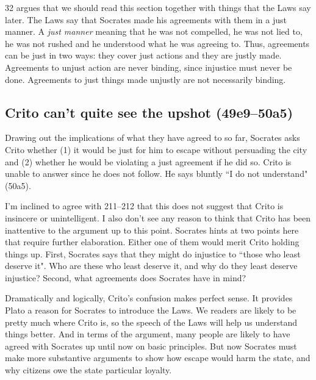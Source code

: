 \documentclass[12pt,letterpaper]{article}
\begin{document}
\cite{kraut1984} 32 argues that we should read this section together with things that the Laws say later. The Laws say that Socrates made his agreements with them in a just manner. A \emph{just manner} meaning that he was not compelled, he was not lied to, he was not rushed and he understood what he was agreeing to. Thus, agreements can be just in two ways: they cover just actions and they are justly made. Agreements to unjust action are never binding, since injustice must never be done. Agreements to just things made unjustly are not necessarily binding.

\subsection*{Crito can't quite see the upshot (49e9--50a5)}

Drawing out the implications of what they have agreed to so far, Socrates
asks Crito whether (1) it would be just for him to escape without
persuading the city and (2) whether he would be violating a just agreement
if he did so. Crito is unable to answer since he does not follow. He says
bluntly ``I do not understand" (50a5).

I'm inclined to agree with \cite{brickhouse-smith2004-plato-trial-of-socrates} 211--212 that this does
not suggest that Crito is insincere or unintelligent. I also don't see any
reason to think that Crito has been inattentive to the argument up to this
point. Socrates hints at two points here that require further elaboration.
Either one of them would merit Crito holding things up. First, Socrates
says that they might do injustice to ``those who least deserve it". Who are
these who least deserve it, and why do they least deserve injustice?
Second, what agreements does Socrates have in mind?

Dramatically and logically, Crito's confusion makes perfect sense. It
provides Plato a reason for Socrates to introduce the Laws. We readers are
likely to be pretty much where Crito is, so the speech of the Laws will
help us understand things better. And in terms of the argument, many
people are likely to have agreed with Socrates up until now on basic
principles. But now Socrates must make more substantive arguments to show
how escape would harm the state, and why citizens owe the state particular
loyalty.

\end{document}
